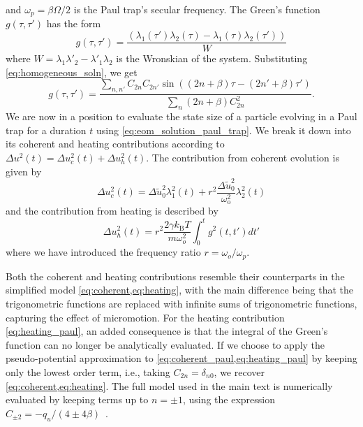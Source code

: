 %
and $\omega_p = \beta\Omega/2$ is the Paul trap's secular frequency. The Green's function $g(\tau, \tau')$ has the form
%
\begin{equation}
    g(\tau, \tau') = \frac{\left(\lambda_1(\tau')\lambda_2(\tau) - \lambda_1(\tau)\lambda_2(\tau')\right)}{W}
\end{equation}
%
where $W=\lambda_1\lambda'_2 - \lambda'_1\lambda_2$ is the Wronskian of the system. Substituting \cref{eq:homogeneous_soln}, we get
%
\begin{equation}
  g(\tau, \tau') =
  \frac{\sum_{n, n'}C_{2n}C_{2n'}
  \sin\left((2n+\beta)\tau -(2n'+\beta)\tau' \right)}{\sum_n(2n+\beta)C_{2n}^2}.
\end{equation}
%
We are now in a position to evaluate the state size of a particle evolving in a Paul trap for a duration $t$ using \cref{eq:eom_solution_paul_trap}. We break it down into its coherent and heating contributions according to $\Delta u^2(t) =\Delta u_c^2(t) + \Delta u_h^2(t)$. The contribution from coherent evolution is given by
%
\begin{equation}
    \Delta u_c^2(t) =
    \Delta\tilde{u}_0^2 \lambda^2_1(t)
 	+ r^2\frac{\Delta\tilde{u}_0^2}{\omega_\text{o}^2} \lambda_2^2(t)
    \label{eq:coherent_paul}
\end{equation}
%
and the contribution from heating is described by
%
\begin{equation}
    \Delta u_h^2(t) =
    r^2\frac{2\gamma k_\text{B}T}{m\omega_o^2}
 	\int_0^t g^2(t, t')dt'
    \label{eq:heating_paul}
\end{equation}
where we have introduced the frequency ratio $r=\omega_o/\omega_p$.

Both the coherent and heating contributions resemble their counterparts in the simplified model \cref{eq:coherent,eq:heating}, with the main difference being that the trigonometric functions are replaced with infinite sums of trigonometric functions, capturing the effect of micromotion. For the heating contribution \cref{eq:heating_paul}, an added consequence is that the integral of the Green's function can no longer be analytically evaluated. If we choose to apply the pseudo-potential approximation to \cref{eq:coherent_paul,eq:heating_paul} by keeping only the lowest order term, i.e., taking $C_{2n}=\delta_{n0}$, we recover \cref{eq:coherent,eq:heating}.
%
The full model used in the main text is numerically evaluated by keeping terms up to $n=\pm1$, using the expression $C_{\pm2}={-q_u}/{(4\pm4\beta)}$~\cite{abramowitz1964handbook}.



